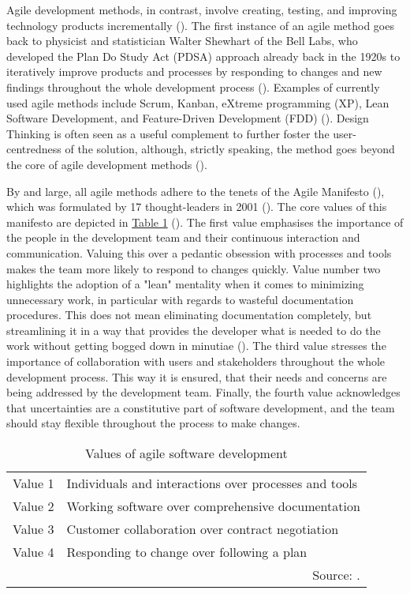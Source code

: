  \par 
Agile development methods, in contrast, involve creating, testing, and improving technology products incrementally (\cite{Mergel2016}). The first instance of an agile method goes back to physicist and statistician Walter Shewhart of the Bell Labs, who developed the Plan Do Study Act (PDSA) approach already back in the 1920s to iteratively improve products and processes by responding to changes and new findings throughout the whole development process (\cite{Goldman1994}). Examples of currently used agile methods include Scrum, Kanban, eXtreme programming (XP), Lean Software Development, and Feature-Driven Development (FDD) (\cite{Dingsoyr2012, Rigby2016a}). Design Thinking is often seen as a useful complement to further foster the user-centredness of the solution, although, strictly speaking, the method goes beyond the core of agile development methods (\cite{DaSilva2011, AustralianDigitalTransformationAgency2019}).\par  
By and large, all agile methods adhere to the tenets of the Agile Manifesto (\cite*{AgileManifesto2001}), which was formulated by 17 thought-leaders in 2001 (\cite{Rigby2016a}). The core values of this manifesto are depicted in \hyperref[tab: Values of agile software development]{Table 1} (\cite{Dingsoyr2012}). The first value emphasises the importance of the people in the development team and their continuous interaction and communication. Valuing this over a pedantic obsession with processes and tools makes the team more likely to respond to changes quickly. Value number two highlights the adoption of a "lean" mentality when it comes to minimizing unnecessary work, in particular with regards to wasteful documentation procedures. This does not mean eliminating documentation completely, but streamlining it in a way that provides the developer what is needed to do the work without getting bogged down in minutiae (\cite{Eby2016}). The third value stresses the importance of collaboration with users and stakeholders throughout the whole development process. This way it is ensured, that their needs and concerns are being addressed by the development team. Finally, the fourth value acknowledges that uncertainties are a constitutive part of software development, and the team should stay flexible throughout the process to make changes.\par
%
\begin{table}[ht!]
	\centering
	\caption{Values of agile software development}\label{tab: Values of agile software development}
	\renewcommand{\arraystretch}{1.4}
	\begin{tabular}{ p{1.5cm} p{9cm} }
		\hline
		Value 1 & Individuals and interactions over processes and tools\\
		Value 2 & Working software over comprehensive documentation\\
		Value 3 & Customer collaboration over contract negotiation\\
		Value 4 & Responding to change over following a plan\\
		\hline
		\multicolumn{2}{r}{Source: \cite{AgileManifesto2001}.}	
	\end{tabular}
\end{table}
